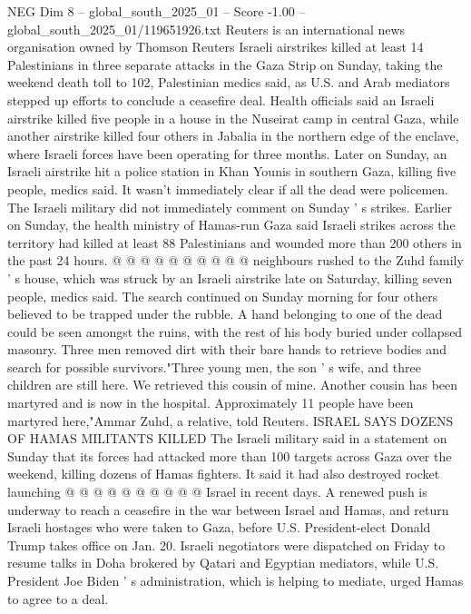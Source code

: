 \begin{textsample}{NEG Dim 8 – global\_south\_2025\_01 – Score -1.00 – global\_south\_2025\_01/119651926.txt}  \label{ex:f8_neg_328}
Reuters is an international news organisation owned by Thomson Reuters Israeli airstrikes killed at least 14 Palestinians in three separate attacks in the Gaza Strip on Sunday, taking the weekend death toll to 102, Palestinian medics said, as U.S. and Arab mediators stepped up efforts to conclude a ceasefire deal.
Health officials said an Israeli airstrike killed five people in a house in the Nuseirat camp in central Gaza, while another airstrike killed four others in Jabalia in the northern edge of the enclave, where Israeli forces have been operating for three months.
Later on Sunday, an Israeli airstrike hit a police station in Khan Younis in southern Gaza, killing five people, medics said.
It wasn't immediately clear if all the dead were policemen.
The Israeli military did not immediately comment on Sunday ' s strikes.
Earlier on Sunday, the health ministry of Hamas-run Gaza said Israeli strikes across the territory had killed at least 88 Palestinians and wounded more than 200 others in the past 24 hours. @ @ @ @ @ @ @ @ @ @ neighbours rushed to the Zuhd family ' s house, which was struck by an Israeli airstrike late on Saturday, killing seven people, medics said.
The search continued on Sunday morning for four others believed to be trapped under the rubble.
A hand belonging to one of the dead could be seen amongst the ruins, with the rest of his body buried under collapsed masonry.
Three men removed dirt with their bare hands to retrieve bodies and search for possible survivors."Three young men, the son ' s wife, and three children are still here.
We retrieved this cousin of mine.
Another cousin has been martyred and is now in the hospital.
Approximately 11 people have been martyred here,"Ammar Zuhd, a relative, told Reuters.
ISRAEL SAYS DOZENS OF HAMAS MILITANTS KILLED The Israeli military said in a statement on Sunday that its forces had attacked more than 100 targets across Gaza over the weekend, killing dozens of Hamas fighters.
It said it had also destroyed rocket launching @ @ @ @ @ @ @ @ @ @ Israel in recent days.
A renewed push is underway to reach a ceasefire in the war between Israel and Hamas, and return Israeli hostages who were taken to Gaza, before U.S.
President-elect Donald Trump takes office on Jan. 20.
Israeli negotiators were dispatched on Friday to resume talks in Doha brokered by Qatari and Egyptian mediators, while U.S.
President Joe Biden ' s administration, which is helping to mediate, urged Hamas to agree to a deal.

\end{textsample}
